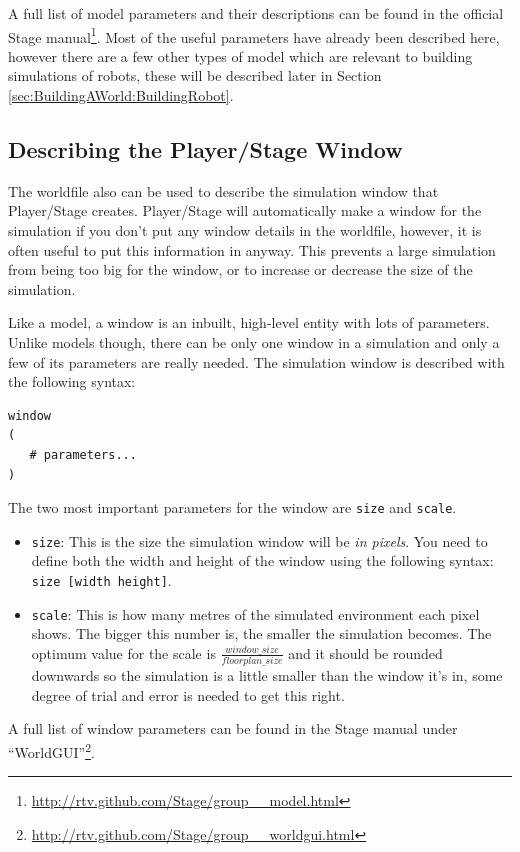 \documentclass[a4paper]{report}
\newcommand{\plst}{Player/Stage\xspace}
\begin{document}
A full list of model parameters and their descriptions can be found in the official Stage manual\footnote{\url{http://rtv.github.com/Stage/group__model.html}}. Most of the useful parameters have already been described here, however there are a few other types of model which are relevant to building simulations of robots, these will be described later in Section \ref{sec:BuildingAWorld:BuildingRobot}.


\subsection{Describing the \plst Window} \label{sec:BuildingAWorld:EmptyWorld:PLSTWindow}

The worldfile also can be used to describe the simulation window that \plst creates. \plst will automatically make a window for the simulation if you don't put any window details in the worldfile, however, it is often useful to put this information in anyway. This prevents a large simulation from being too big for the window, or to increase or decrease the size of the simulation.

Like a model, a window is an inbuilt, high-level entity with lots of parameters. Unlike models though, there can be only one window in a simulation and only a few of its parameters are really needed. The simulation window is described with the following syntax:
\begin{verbatim}
window
(
   # parameters...
)
\end{verbatim}

The two most important parameters for the window are \verb|size| and \verb|scale|.
\begin{itemize}
\item \verb|size|: This is the size the simulation window will be \emph{in pixels}. You need to define both the width and height of the window using the following syntax: \verb|size [width height]|. 
\item \verb|scale|: This is how many metres of the simulated environment each pixel shows. The bigger this number is, the smaller the simulation becomes. The optimum value for the scale is $\frac{window\_size}{floorplan\_size}$ and it should be rounded downwards so the simulation is a little smaller than the window it's in, some degree of trial and error is needed to get this right. 
\end{itemize}

A full list of window parameters can be found in the Stage manual under ``WorldGUI''\footnote{\url{http://rtv.github.com/Stage/group__worldgui.html}}.
\end{document}
